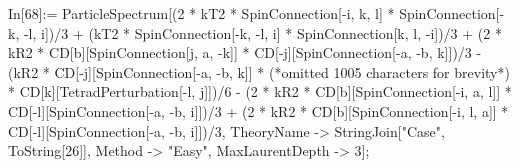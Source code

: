 In[68]:= ParticleSpectrum[(2 * kT2 * SpinConnection[-i, k, l] * SpinConnection[-k, -l, i])/3 + (kT2 * SpinConnection[-k, -l, i] * SpinConnection[k, l, -i])/3 + (2 * kR2 * CD[b][SpinConnection[j, a, -k]] * CD[-j][SpinConnection[-a, -b, k]])/3 - (kR2 * CD[-j][SpinConnection[-a, -b, k]] * (*omitted 1005 characters for brevity*) * CD[k][TetradPerturbation[-l, j]])/6 - (2 * kR2 * CD[b][SpinConnection[-i, a, l]] * CD[-l][SpinConnection[-a, -b, i]])/3 + (2 * kR2 * CD[b][SpinConnection[-i, l, a]] * CD[-l][SpinConnection[-a, -b, i]])/3, TheoryName -> StringJoin["Case", ToString[26]], Method -> "Easy", MaxLaurentDepth -> 3];